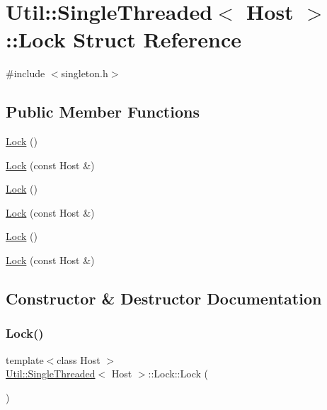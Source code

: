 \hypertarget{structUtil_1_1SingleThreaded_1_1Lock}{}\section{Util\+:\+:Single\+Threaded$<$ Host $>$\+:\+:Lock Struct Reference}
\label{structUtil_1_1SingleThreaded_1_1Lock}


{\ttfamily \#include $<$singleton.\+h$>$}

\subsection*{Public Member Functions}
\begin{DoxyCompactItemize}
\item 
\mbox{\hyperlink{structUtil_1_1SingleThreaded_1_1Lock_afd207df7a7a755030a139f082bdd3ac7}{Lock}} ()
\item 
\mbox{\hyperlink{structUtil_1_1SingleThreaded_1_1Lock_ad3f29b21cc23169f60d96950ad9cb99f}{Lock}} (const Host \&)
\item 
\mbox{\hyperlink{structUtil_1_1SingleThreaded_1_1Lock_afd207df7a7a755030a139f082bdd3ac7}{Lock}} ()
\item 
\mbox{\hyperlink{structUtil_1_1SingleThreaded_1_1Lock_ad3f29b21cc23169f60d96950ad9cb99f}{Lock}} (const Host \&)
\item 
\mbox{\hyperlink{structUtil_1_1SingleThreaded_1_1Lock_afd207df7a7a755030a139f082bdd3ac7}{Lock}} ()
\item 
\mbox{\hyperlink{structUtil_1_1SingleThreaded_1_1Lock_ad3f29b21cc23169f60d96950ad9cb99f}{Lock}} (const Host \&)
\end{DoxyCompactItemize}


\subsection{Constructor \& Destructor Documentation}
\mbox{\label{structUtil_1_1SingleThreaded_1_1Lock_afd207df7a7a755030a139f082bdd3ac7}} 
\subsubsection{\texorpdfstring{Lock()}{Lock()}\hspace{0.1cm}{\footnotesize\ttfamily [1/6]}}
{\footnotesize\ttfamily template$<$class Host $>$ \\
\mbox{\hyperlink{classUtil_1_1SingleThreaded}{Util\+::\+Single\+Threaded}}$<$ Host $>$\+::Lock\+::\+Lock (\begin{DoxyParamCaption}{ }\end{DoxyParamCaption})\hspace{0.3cm}{\ttfamily [inline]}}

